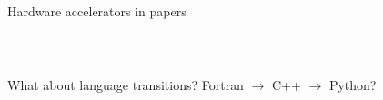 \documentclass[aspectratio=169]{beamer}
\begin{document}
\begin{frame}{Hardware accelerators in  papers}
\vspace{0.35 cm}

\begin{columns}
\end{columns}
\end{frame}

\begin{frame}{\mbox{ }}
\vspace{1 cm}
\begin{center}
\Large What about language transitions? Fortran $\to$ C++ $\to$ Python?
\end{center}
\end{frame}
\end{document}
